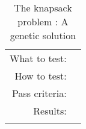 \begin{table}[H]
  \begin{tabular}{r | p{8cm}}
    \noalign{\smallskip}\hline\noalign{\smallskip}
    
    What to test:  & \\

    \noalign{\smallskip}\hline\noalign{\smallskip}

    How to test:  & \\

    \noalign{\smallskip}\hline\noalign{\smallskip}

    Pass criteria: &  \\
    
     \noalign{\smallskip}\hline\noalign{\smallskip}

    Results: &   \\
   \noalign{\smallskip}\hline\noalign{\smallskip}
  
  
  \end{tabular}
  \caption{The knapsack problem : A genetic solution}
  \label{testing:fitness:pipeline_test}
\end{table}

